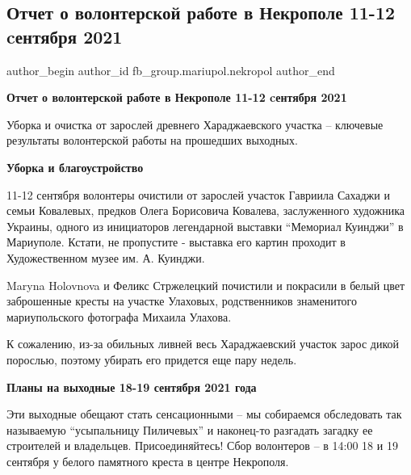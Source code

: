  
 
 
 
 

\subsection{Отчет о волонтерской работе в Некрополе 11-12 cентября 2021}
\label{sec:16_09_2021.fb.fb_group.mariupol.nekropol.1.otchet_o_volonterskoj_rabote_11_12_sentjabrja}

\ifcmt
 author_begin
   author_id fb_group.mariupol.nekropol
 author_end
\fi

\vspace{0.5cm}
\textbf{Отчет о волонтерской работе в Некрополе 11-12 cентября 2021}

Уборка и очистка от зарослей древнего Хараджаевского участка – ключевые результаты волонтерской работы на прошедших выходных.

\textbf{Уборка и благоустройство}

11-12 сентября волонтеры очистили от зарослей участок Гавриила Сахаджи и семьи
Ковалевых, предков Олега Борисовича Ковалева, заслуженного художника Украины,
одного из инициаторов легендарной выставки \enquote{Мемориал Куинджи} в
Мариуполе.  Кстати, не пропустите - выставка его картин проходит в
Художественном музее им.  А. Куинджи.

Maryna Holovnova и Феликс Стржелецкий почистили и покрасили в белый цвет
заброшенные кресты на участке Улаховых, родственников знаменитого
мариупольского фотографа Михаила Улахова.

К сожалению, из-за обильных ливней весь Хараджаевский участок зарос дикой
порослью, поэтому убирать его придется еще пару недель.

\textbf{Планы на выходные 18-19 сентября 2021 года}

Эти выходные обещают стать сенсационными – мы собираемся обследовать так
называемую \enquote{усыпальницу Пиличевых} и наконец-то разгадать загадку ее
строителей и владельцев. Присоединяйтесь! Сбор волонтеров – в 14:00 18 и 19
сентября у белого памятного креста в центре Некрополя.

